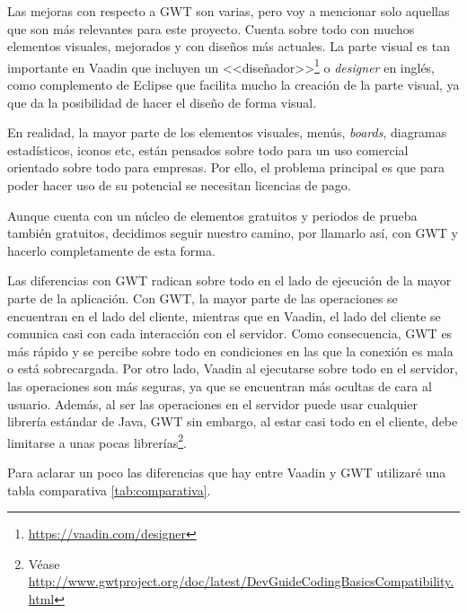 Las mejoras con respecto a GWT son varias, pero voy a mencionar solo aquellas que son más relevantes para este proyecto. Cuenta sobre todo con muchos elementos visuales, mejorados y con diseños más actuales. La parte visual es tan importante en Vaadin que incluyen un <<diseñador>>\footnote{\url{https://vaadin.com/designer}} o \emph{designer} en inglés, como complemento de Eclipse que facilita mucho la creación de la parte visual, ya que da la posibilidad de hacer el diseño de forma visual.

En realidad, la mayor parte de los elementos visuales, menús, \emph{boards}, diagramas estadísticos, iconos etc, están pensados sobre todo para un uso comercial orientado sobre todo para empresas. Por ello, el problema principal es que para poder hacer uso de su potencial se necesitan licencias de pago.

Aunque cuenta con un núcleo de elementos gratuitos y periodos de prueba también gratuitos, decidimos seguir nuestro camino, por llamarlo así, con GWT y hacerlo completamente de esta forma.

Las diferencias con GWT radican sobre todo en el lado de ejecución de la mayor parte de la aplicación. Con GWT, la mayor parte de las operaciones se encuentran en el lado del cliente, mientras que en Vaadin, el lado del cliente se comunica casi con cada interacción con el servidor. Como consecuencia, GWT es más rápido y se percibe sobre todo en condiciones en las que la conexión es mala o está sobrecargada. Por otro lado, Vaadin al ejecutarse sobre todo en el servidor, las operaciones son más seguras, ya que se encuentran más ocultas de cara al usuario. Además, al ser las operaciones en el servidor puede usar cualquier librería estándar de Java, GWT sin embargo, al estar casi todo en el cliente, debe limitarse a unas pocas librerías\footnote{Véase \url{http://www.gwtproject.org/doc/latest/DevGuideCodingBasicsCompatibility.html}}.

Para aclarar un poco las diferencias que hay entre Vaadin y GWT utilizaré una tabla comparativa \ref{tab:comparativa}.




